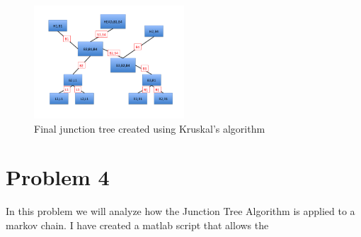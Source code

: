 \documentclass[paper=a4, fontsize=11pt]{scrartcl} %
\begin{document}
\begin{figure}
\centering
\includegraphics[width=0.5\textwidth]{Problem3/Slide5.png}
\caption{Final junction tree created using Kruskal's algorithm}
\label{fig:ver2}
\end{figure}

\section{Problem 4}
In this problem we will analyze how the Junction Tree Algorithm is applied to a markov chain.
I have created a matlab script that allows the 
\end{document}
